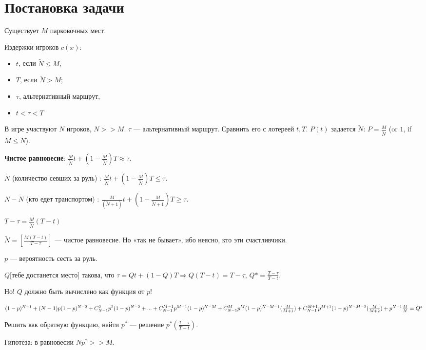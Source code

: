 \section{Постановка задачи}

Существует $M$ парковочных мест.

Издержки игроков $c(x)$:
\begin{itemize}
 \item  $t$, если $\tilde N\le M$,
 \item  $T$, если $\tilde N>M$;
 \item  $\tau$, альтернативный маршрут,
 \item  $t<\tau<T$
\end{itemize}
В игре участвуют $N$ игроков, $N >> M$.
$\tau$ — альтернативный маршрут.
Сравнить его с лотереей ${t,T}$.
$P(t)$ задается $\tilde N$: $P=\frac{M}{\tilde{N}}$ (or $1$, if $M \le \tilde N$).

\textbf{Чистое равновесие}: $\frac{M}{\tilde N}t+(1-\frac{M}{\tilde{N}})T\approx\tau$.


$\tilde{N}$ (количество севших за руль) : $\frac{M}{\tilde{N}}t+(1-\frac{M}{\tilde{N}})T\le\tau$.

${N-\tilde N}$ (кто едет транспортом) : $\frac{M}{(\tilde{N}+1)}t+(1-\frac{M}{\tilde{N}+1})T\ge\tau$.

$T-\tau = \frac{M}{\tilde{N}}(T-t)$

$\tilde{N}=[\frac{M(T-t)}{T-\tau}]$ — чистое равновесие. Но «так не бывает», ибо неясно, кто эти счастливчики.

$p$ — вероятность сесть за руль.

$Q$[тебе достанется место] такова, что $\tau = Qt+(1-Q)T \Rightarrow Q(T-t)=T-\tau$, $Q*=\frac{T-\tau}{T-t}$.

Но! $Q$ должно быть вычислено как функция от $p$!

$(1-p)^{N-1} + \\ (N-1)p(1-p)^{N-2} + \\ C_{N-1}^2 p^2(1-p)^{N-2} + ... + \\ C_{N-1}^{M-1}p^{M-1}(1-p)^{N-M} + \\ C_{N-1}^{M}p^M(1-p)^{N-M-1}(\frac{M}{M+1}) + \\ C_{N-1}^{M+1}p^{M+1}(1-p)^{N-M-2}(\frac{M}{M+2}) + \\ p^{N-1}\frac{M}{N} = \\ Q^*$

Решить как обратную функцию, найти $p^*$ — решение $p^*(\frac{T-\tau}{T-t})$.

Гипотеза: в равновесии $Np^* >> M$.


